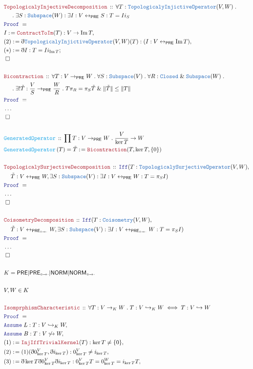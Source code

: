 \documentclass[12pt]{scrartcl}
\newcommand{\TYPE}[1]{\textcolor{NavyBlue}{\mathtt{#1}}}
\newcommand{\FUNC}[1]{\textcolor{Cerulean}{\mathtt{#1}}}
\newcommand{\LOGIC}[1]{\textcolor{Blue}{\mathtt{#1}}}
\newcommand{\THM}[1]{\textcolor{Maroon}{\mathtt{#1}}}
\renewcommand{\.}{\; . \;}
\newcommand{\de}{: \kern 0.1pc =}
\newcommand{\Act}[1]{\left( #1 \right)}
\newcommand{\Theorem}[2]{& \THM{#1} \, :: \, #2 \\ & \Proof = \\ }
\newcommand{\DeclareFunc}[2]{& \FUNC{#1} \, :: \, #2 \\}
\newcommand{\DefineNamedFunc}[4]{&  \FUNC{#1}\Act{#2} = #3 \de #4 \\}
\newcommand{\NewLine}{\\ & \kern 1pc}
\newcommand{\Page}[1]{\begin{align*} #1 \end{align*} \newpage   }
\newcommand{ \bd }{ \ByDef }
\newcommand{\NoProof}{ & \ldots \\ \EndProof}
\renewcommand{\And}{\; \& \;}
\DeclareMathOperator*{\im}{Im}
\newcommand{\ToInj}{\hookrightarrow}
\newcommand{\ToBij}{\leftrightarrow}
\newcommand{\Say}[3]{& #1 \de #2 : #3, \\}
\newcommand{\Conclude}[3]{& #1 \de #2 : #3; \\}
\newcommand{\A}{\LOGIC{Assume} \;}
\newcommand{\Assume}[2]{& \A #1 : #2, \\}
\newcommand{\QED}{\; \square}
\newcommand{\EndProof}{& \QED \\}
\newcommand{\ByDef}{\eth}
\newcommand{\Proof}{\LOGIC{Proof} \; }
\newcommand{\PRE}{\mathsf{PRE}} %
\newcommand{\PREI}{\mathsf{PRE}_{\circ \to \cdot}} %
\newcommand{\NORM}{\mathsf{NORM}} %
\newcommand{\NORMI}{\mathsf{NORM}_{\circ \to \cdot}} %
\begin{document}
     \Page{
        \Theorem{TopologicalyInjectiveDecomposition}{ 
        \forall T : \TYPE{TopologicalyInjictiveOperator}(V,W) \. 
        \NewLine  \.
         \exists S : \TYPE{Subspace}(W) : 
         \exists I : V \ToBij_\PRE  S :   T = I i_S  
        }
         \Say{I}{ \THM{ContractToIm}(T) }{V \to \im T}
         \Say{(2)}{ \bd \TYPE{TopologicalyInjictiveOperator}(V,W)(T)  }
         { (I : V \ToBij_\PRE \im T)  }
         \Conclude{ (*) }{ \bd I }{  T = I i_{\im T} }
         \EndProof            
     \\
     \Theorem{Bicontraction}{ \forall T : V \to_\PRE W \.  \forall S : 
      \TYPE{Subspace}(V) \. \forall 
      R : \TYPE{Closed} \And \TYPE{Subspace}(W) \. \NewLine \.
       \exists ! \tilde T : \frac{V}{S} \to_\PRE \frac{W}{R} \.
       T\pi_R =\pi_S \tilde T \And \| \tilde T \| \le \| T \|      
     }
     \NoProof
     \\
     \DeclareFunc{GeneratedOperator}{ \prod T : V \to_\PRE W \. \frac{V}{\ker T} \to W }
     \DefineNamedFunc{ GeneratedOperator }{T}{\tilde T }{\THM{Bicontraction}(T, \ker T,  \{  0 \})}
     \\
     \Theorem{TopologicalySurjectiveDecomposition}{ 
     \LOGIC{Iff}( T : \TYPE{TopologicalySurjectiveOperator}(V,W), \NewLine
              \tilde T : V \ToBij_\PRE W  , 
              \exists S :  \TYPE{Subspace}(V) :
              \exists I : V \ToBij_\PRE W  : T = \pi_S I      )     
                 }
        \NoProof
        \\
     \Theorem{CoisometryDecomposition}{ 
     \LOGIC{Iff}( T : \TYPE{Coisometry}(V,W), \NewLine
              \tilde T : V \ToBij_{\PREI} W, 
              \exists S :  \TYPE{Subspace}(V) :
              \exists I : V \ToBij_{\PREI} W  : T = \pi_S I      )     
                 } 
       \NoProof
     \\
     & K = \PRE | \PREI | \NORM | \NORMI \\
     \\
     & V,W \in K  \\
     \\
     \Theorem{IsomprphismCharacteristic}{ \forall T : V \to_K W \. T  : V \ToInj_K W  \iff
      T : V \ToInj W     } 
      \Assume{L}{ T : V \ToInj_K W }
      \Assume{B}{ T : V \not \ToInj W }
      \Say{(1)}{ \THM{InjIffTrivialKernel}(T)  }{ \ker T \neq \{ 0 \} }
      \Say{ (2) }{ (1)(\bd 0_{\ker T}^V, \bd i_{\ker T})}{ 0_{\ker T}^V \neq i_{\ker T} }
      \Say{ (3) }{ \bd \ker T \bd 0_{\ker T}^V \bd i_{\ker T}}{ 0_{\ker T}^V T = 0_{\ker T}^W =  i_{\ker T} T }
       }             
\end{document}
